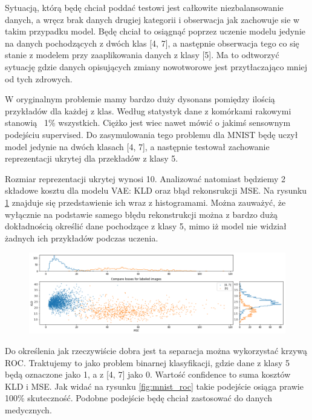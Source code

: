 Sytuacją, którą będę chciał poddać testowi jest całkowite niezbalansowanie danych, a wręcz brak danych drugiej kategorii i obserwacja jak zachowuje sie w takim przypadku model. Będę chciał to osiągnąć poprzez uczenie modelu jedynie na danych pochodzących z dwóch klas [4, 7], a następnie obserwacja tego co się stanie z modelem przy zaaplikowania danych z klasy [5]. Ma to odtworzyć sytuację gdzie danych opisujących zmiany nowotworowe jest przytłaczająco mniej od tych zdrowych.

W oryginalnym problemie mamy bardzo duży dysonans pomiędzy ilością przykładów dla każdej z klas. Według statystyk dane z komórkami rakowymi stanowią ~1\% wszystkich. Ciężko jest wiec nawet mówić o jakimś sensownym podejściu supervised. Do zasymulowania tego problemu dla MNIST będę uczył model jedynie na dwóch klasach [4, 7], a następnie testował zachowanie reprezentacji ukrytej dla przekładów z klasy 5.

Rozmiar reprezentacji ukrytej wynosi 10. Analizować natomiast będziemy 2 składowe kosztu dla modelu VAE: KLD oraz błąd rekonsrukcji MSE. Na rysunku \ref{fig:mnist_compare} znajduje się przedstawienie ich wraz z histogramami. Można zauważyć, że wyłącznie na podstawie samego błędu rekonstrukcji można z bardzo dużą dokładnością określić dane pochodzące z klasy 5, mimo iż model nie widział żadnych ich przykładów podczas uczenia.

\begin{figure}[h!]
    \centering
    \includegraphics[width=1.0\textwidth]{images/mnist_compare}
    \caption{}
    \label{fig:mnist_compare}
\end{figure}

Do określenia jak rzeczywiście dobra jest ta separacja można wykorzystać krzywą ROC. Traktujemy to jako problem binarnej klasyfikacji, gdzie dane z klasy 5 będą oznaczone jako 1, a z [4, 7] jako 0. Wartość confidence to suma kosztów KLD i MSE. Jak widać na rysunku \ref{fig:mnist_roc} takie podejście osiąga prawie 100\% skuteczność. Podobne podejście będę chciał zastosować do danych medycznych.


